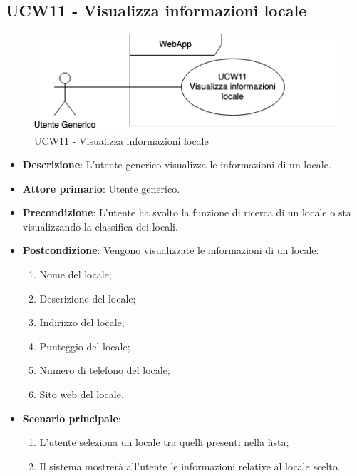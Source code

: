 \subsection{UCW11 - Visualizza informazioni locale}
\begin{figure}[!h]
\centering
\includegraphics[scale=0.5]{UC_images/UCW11.png} 
\caption{UCW11 - Visualizza informazioni locale}
\end{figure}
\begin{itemize}
    \item \textbf{Descrizione}: L'utente generico visualizza le informazioni di un locale.
    \item \textbf{Attore primario}: Utente generico.
    \item \textbf{Precondizione}: L'utente ha svolto la funzione di ricerca di un locale o sta visualizzando la classifica dei locali.
    \item \textbf{Postcondizione}: Vengono visualizzate le informazioni di un locale:
    \begin{enumerate}
        \item Nome del locale;
        \item Descrizione del locale;
        \item Indirizzo del locale;
        \item Punteggio del locale;
        \item Numero di telefono del locale;
        \item Sito web del locale.
        \end{enumerate}
    \item \textbf{Scenario principale}: 
    \begin{enumerate}
    \item L'utente seleziona un locale tra quelli presenti nella lista;
    \item Il sistema mostrerà all'utente le informazioni relative al locale scelto.
    \end{enumerate}
\end{itemize}
